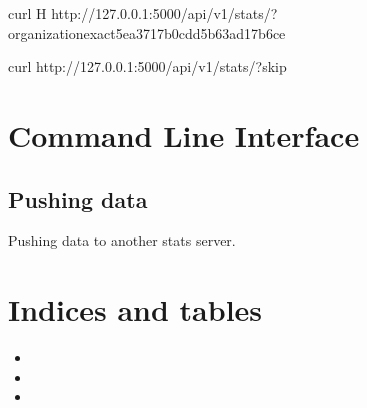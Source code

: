 \documentclass[letterpaper,10pt,english]{sphinxmanual}
\begin{document}
\begin{sphinxVerbatim}[commandchars=\\\{\}]
\PYGZdl{} curl \PYGZhy{}H   http://127.0.0.1:5000/api/v1/stats/?organization\PYGZus{}\PYGZus{}exact5ea3717b0cdd5b63ad17b6ce

\PYGZdl{} curl http://127.0.0.1:5000/api/v1/stats/?\PYGZus{}skip
\end{sphinxVerbatim}


\chapter{Command Line Interface}
\label{\detokenize{command-line-interface:command-line-interface}}\label{\detokenize{command-line-interface::doc}}

\section{Pushing data}
\label{\detokenize{command-line-interface:pushing-data}}
Pushing data to another stats server.


\chapter{Indices and tables}
\label{\detokenize{index:indices-and-tables}}\begin{itemize}
\item {} 

\item {} 

\item {} 

\end{itemize}



\renewcommand{\indexname}{Index}
\printindex
\end{document}
